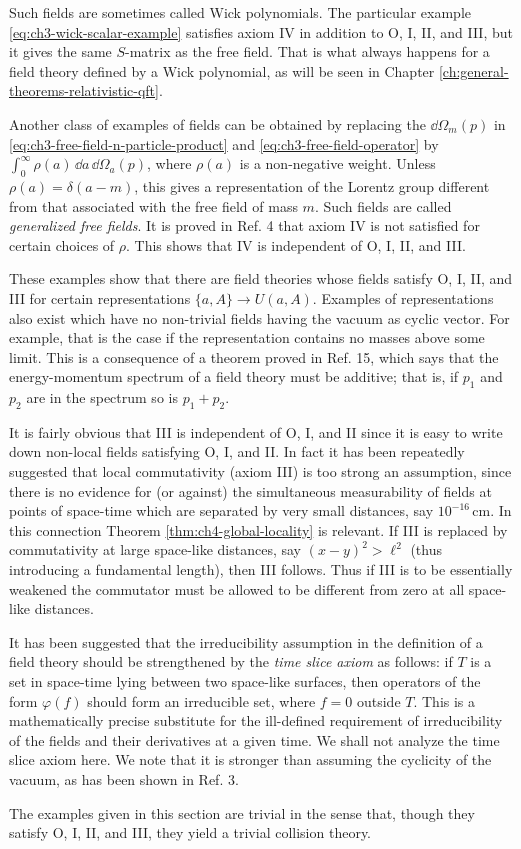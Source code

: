 Such fields are sometimes called Wick polynomials.  The particular example
\eqref{eq:ch3-wick-scalar-example} satisfies axiom IV in addition to O, I, II, and III, but it gives the
same $S$-matrix as the free field.  That is what always happens for a field
theory defined by a Wick polynomial, as will be seen in Chapter \ref{ch:general-theorems-relativistic-qft}.

Another class of examples of fields can be obtained by replacing the
$\dd\Omega_m(p)$ in \eqref{eq:ch3-free-field-n-particle-product} and \eqref{eq:ch3-free-field-operator} by
$\int_0^\infty\rho(a)\,\dd a\,\dd\Omega_a(p)$, where $\rho(a)$ is a
non-negative weight.  Unless $\rho(a)=\delta(a-m)$, this gives a
representation of the Lorentz group different from that associated with the
free field of mass $m$.  Such fields are called \emph{generalized free
fields}.  It is proved in Ref. 4 that axiom IV is not satisfied for certain
choices of $\rho$.  This shows that IV is independent of O, I, II, and III.

These examples show that there are field theories whose fields satisfy O, I,
II, and III for certain representations $\{a,A\}\longrightarrow U(a,A)$.
Examples of representations also exist which have no non-trivial fields
having the vacuum as cyclic vector.  For example, that is the case if the
representation contains no masses above some limit.  This is a consequence
of a theorem proved in Ref. 15, which says that the energy-momentum spectrum
of a field theory must be additive; that is, if $p_1$ and $p_2$ are in the
spectrum so is $p_1+p_2$.

It is fairly obvious that III is independent of O, I, and II since it is easy
to write down non-local fields satisfying O, I, and II.  In fact it has been
repeatedly suggested that local commutativity (axiom III) is too strong an
assumption, since there is no evidence for (or against) the simultaneous
measurability of fields at points of space-time which are separated by very
small distances, say $10^{-16}\,\mathrm{cm}$.  In this connection Theorem \ref{thm:ch4-global-locality}
is relevant.  If III is replaced by commutativity at large space-like
distances, say $(x-y)^2>\ell^2$ (thus introducing a fundamental length), then
III follows.  Thus if III is to be essentially weakened the commutator must
be allowed to be different from zero at all space-like distances.

It has been suggested that the irreducibility assumption in the definition
of a field theory should be strengthened by the \emph{time slice axiom} as
follows: if $T$ is a set in space-time lying between two space-like surfaces,
then operators of the form $\varphi(f)$ should form an irreducible set,
where $f=0$ outside $T$.  This is a mathematically precise substitute for
the ill-defined requirement of irreducibility of the fields and their
derivatives at a given time.  We shall not analyze the time slice axiom here.
We note that it is stronger than assuming the cyclicity of the vacuum, as
has been shown in Ref. 3.

The examples given in this section are trivial in the sense that, though they
satisfy O, I, II, and III, they yield a trivial collision theory.
